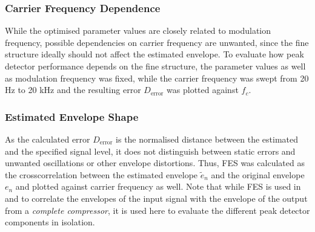 \documentclass[../main2.tex]{subfiles}
\begin{document}
\subsubsection{Carrier Frequency Dependence}
While the optimised parameter values are closely related to modulation frequency, possible dependencies on carrier frequency are unwanted, since the fine structure ideally should not affect the estimated envelope. To evaluate how peak detector performance depends on the fine structure, the parameter values as well as modulation frequency was fixed, while the carrier frequency was swept from 20 Hz to 20 kHz and the resulting error $D_\text{error}$ was plotted against $f_c$.

\subsubsection{Estimated Envelope Shape}
As the calculated error $D_\text{error}$ is the normalised distance between the estimated and the specified signal level, it does not distinguish between static errors and unwanted oscillations or other envelope distortions. Thus, FES was calculated as the crosscorrelation between the estimated envelope $\tilde{e}_n$ and the original envelope $e_n$ and plotted against carrier frequency as well. Note that while FES is used in \cite{stone1992syllabic}\cite{stone2007quantifying} and \cite{reiss2012tutorial} to correlate the envelopes of the input signal with the envelope of the output from a \emph{complete compressor}, it is used here to evaluate the different peak detector components in isolation. 
\end{document}
